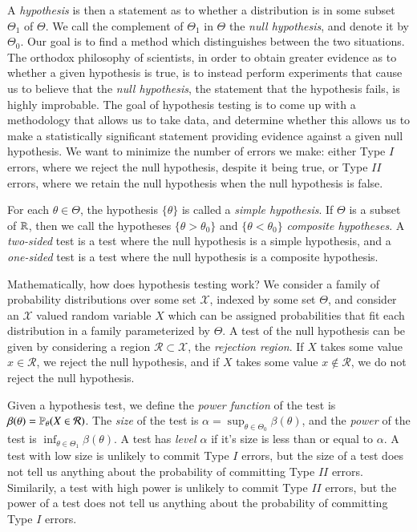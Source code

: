 \newpage





 A \emph{hypothesis} is then a statement as to whether a distribution is in some subset $\Theta_1$ of $\Theta$. We call the complement of $\Theta_1$ in $\Theta$ the \emph{null hypothesis}, and denote it by $\Theta_0$. Our goal is to find a method which distinguishes between the two situations. The orthodox philosophy of scientists, in order to obtain greater evidence as to whether a given hypothesis is true, is to instead perform experiments that cause us to believe that the \emph{null hypothesis}, the statement that the hypothesis fails, is highly improbable. The goal of hypothesis testing is to come up with a methodology that allows us to take data, and determine whether this allows us to make a statistically significant statement providing evidence against a given null hypothesis. We want to minimize the number of errors we make: either Type $I$ errors, where we reject the null hypothesis, despite it being true, or Type $II$ errors, where we retain the null hypothesis when the null hypothesis is false.

For each $\theta \in \Theta$, the hypothesis $\{ \theta \}$ is called a \emph{simple hypothesis}. If $\Theta$ is a subset of $\operatorname{\mathbb{R}}$, then we call the hypotheses $\{ \theta > \theta_0 \}$ and $\{ \theta < \theta_0 \}$ \emph{composite hypotheses}. A \emph{two-sided} test is a test where the null hypothesis is a simple hypothesis, and a \emph{one-sided} test is a test where the null hypothesis is a composite hypothesis.

Mathematically, how does hypothesis testing work? We consider a family of probability distributions over some set $\mathcal{X}$, indexed by some set $\Theta$, and consider an $\mathcal{X}$ valued random variable $X$ which can be assigned probabilities that fit each distribution in a family parameterized by $\Theta$. A test of the null hypothesis can be given by considering a region $\mathcal{R} \subset \mathcal{X}$, the \emph{rejection region}. If $X$ takes some value $x \in \mathcal{R}$, we reject the null hypothesis, and if $X$ takes some value $x \not \in \mathcal{R}$, we do not reject the null hypothesis. 

Given a hypothesis test, we define the \emph{power function} of the test is $\beta(\theta) = \operatorname{\mathbb{P}}_\theta(X \in \mathcal{R})$. The \emph{size} of the test is $\alpha = \sup_{\theta \in \Theta_0} \beta(\theta)$, and the \emph{power} of the test is $\inf_{\theta \in \Theta_1} \beta(\theta)$. A test has \emph{level $\alpha$} if it's size is less than or equal to $\alpha$. A test with low size is unlikely to commit Type $I$ errors, but the size of a test does not tell us anything about the probability of committing Type $II$ errors. Similarily, a test with high power is unlikely to commit Type $II$ errors, but the power of a test does not tell us anything about the probability of committing Type $I$ errors.



